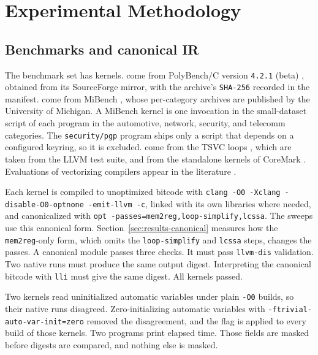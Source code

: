 \section{Experimental Methodology}
\label{sec:methods}

\subsection{Benchmarks and canonical IR}

The benchmark set has \NumKernels{} kernels. \NumPolyBenchKernels{} come from PolyBench/C version \texttt{4.\allowbreak{}2.\allowbreak{}1} (beta)
\cite{pouchet2016polybench}, obtained from its SourceForge mirror, with the archive's \texttt{SHA-256} recorded in the
manifest. \NumMiBenchKernels{} come from MiBench \cite{guthaus2001mibench}, whose per-category archives are published by the
University of Michigan. A MiBench kernel is one invocation in the small-dataset script of each program in the automotive,
network, security, and telecomm categories. The \texttt{security/\allowbreak{}pgp} program ships only a script that depends on a configured
keyring, so it is excluded. \NumTSVCCoreMarkKernels{} come from the TSVC loops \cite{callahan1988vectorizing}, which are taken
from the LLVM test suite, and from the standalone kernels of CoreMark \cite{eembccoremark}. Evaluations of vectorizing compilers appear in the literature \cite{maleki2011evaluation}.

Each kernel is compiled to unoptimized bitcode with \texttt{clang -O0 -Xclang -disable-\allowbreak O0-\allowbreak optnone
-emit-\allowbreak llvm -c}, linked with its own libraries where needed, and canonicalized with
\texttt{opt -passes=\allowbreak mem2reg,\allowbreak loop-simplify,\allowbreak lcssa}. The sweeps use this canonical form. Section~\ref{sec:results-canonical} measures how the \texttt{mem2reg}-only form, which omits the \texttt{loop-simplify} and \texttt{lcssa} steps, changes the passes. A canonical
module passes three checks. It must pass \texttt{llvm-dis} validation. Two native runs must produce the same output digest.
Interpreting the canonical bitcode with \texttt{lli} must give the same digest. All \NumVerifiedKernels{} kernels passed.

Two kernels read uninitialized automatic variables under plain \texttt{-O0} builds, so their native runs disagreed.
Zero-initializing automatic variables with \texttt{-ftrivial-\allowbreak auto-\allowbreak var-\allowbreak init=\allowbreak zero}
removed the disagreement, and the flag is applied to every build of those kernels. Two programs print elapsed time. Those
fields are masked before digests are compared, and nothing else is masked.


